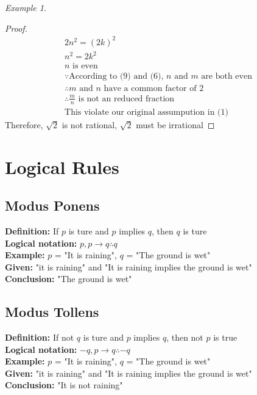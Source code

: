 \documentclass[12pt]{article}
\theoremstyle{remark}
\newtheorem*{example}{Example}
\begin{document}
\begin{example}
\begin{proof}
\begin{gather}
			2n^2 = (2k)^2 \\
			n^2 = 2k^2 \\
			\text{$n$ is even}\\
			\because \text{According to (9) and (6), $n$ and $m$ are both even} \\
			\therefore \text{$m$ and $n$ have a common factor of 2} \\
			\therefore \text{$\frac{m}{n}$ is not an reduced fraction}\\
			\text{This violate our original assumpution in (1)}
		\end{gather}
		Therefore, $\sqrt{2}$ is not rational, $\sqrt{2}$ must be irrational
	\end{proof}
	\end{example}

	\section{Logical Rules}
	\subsection{Modus Ponens}
	\begin{center}

		\textbf{Definition: }If $p$ is ture and $p$ implies $q$, then $q$ is ture \\
		\textbf{Logical notation: } $p, p\to q\therefore q$ \\
		\textbf{Example: }$p$ = "It is raining", $q$ = "The ground is wet"\\
		\textbf{Given: }"it is raining" and "It is raining implies the ground is wet"\\
		\textbf{Conclusion: }"The ground is wet"\\
		
	\end{center}

	\subsection{Modus Tollens}
	\begin{center}
		\textbf{Definition: }If not $q$ is ture and $p$ implies $q$, then not $p$ is true \\
		\textbf{Logical notation: } $-q, p \to q \therefore -q$ \\
		\textbf{Example: } $p$ = "It is raining", $q$ = "The ground is wet"\\
		\textbf{Given: } "it is raining" and "It is raining implies the ground is wet"\\
		\textbf{Conclusion: } "It is not raining"\\
	\end{center}
\end{document}

